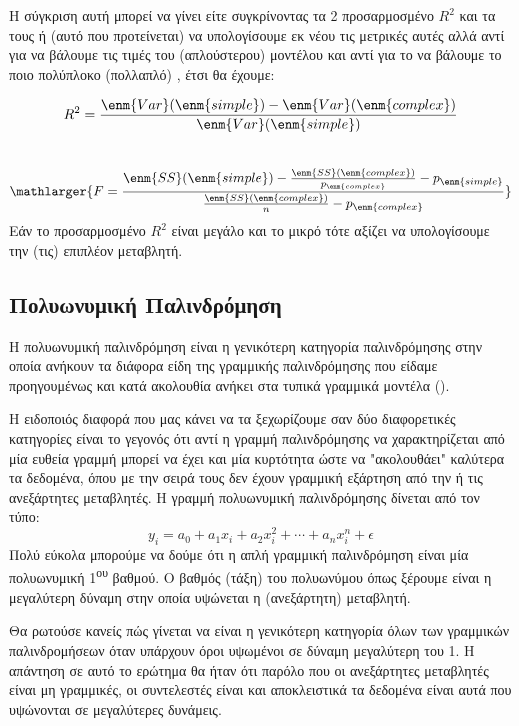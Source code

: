 Η σύγκριση αυτή μπορεί να γίνει είτε
συγκρίνοντας τα 2 προσαρμοσμένο $R^2$
και τα  τους ή (αυτό που προτείνεται) να
υπολογίσουμε εκ νέου τις μετρικές αυτές αλλά αντί για  να βάλουμε τις τιμές του 
(απλούστερου) μοντέλου και αντί για το  να βάλουμε το ποιο πολύπλοκο (πολλαπλό) , έτσι
θα έχουμε:

$$R^2=\frac{\enm{Var}(\enm{simple})-\enm{Var}(\enm{complex})}{\enm{Var}(\enm{simple})}$$
\\
$$\mathlarger{F =\frac{\enm{SS}(\enm{simple}) - \frac{\enm{SS}(\enm{complex})}{p_{\enm{complex}}} - p_{\enm{simple}}} {\frac{\enm{SS}(\enm{complex})}{n} - p_{\enm{complex}}}}$$
Εάν το προσαρμοσμένο $R^2$
είναι μεγάλο και το  μικρό τότε αξίζει να υπολογίσουμε την
(τις) επιπλέον μεταβλητή.
\subsection{Πολυωνυμική Παλινδρόμηση}
Η πολυωνυμική παλινδρόμηση είναι η γενικότερη κατηγορία παλινδρόμησης στην οποία
ανήκουν τα διάφορα είδη της γραμμικής παλινδρόμησης που είδαμε προηγουμένως και κατά
ακολουθία ανήκει στα τυπικά γραμμικά μοντέλα ().

Η ειδοποιός
διαφορά που μας κάνει να τα ξεχωρίζουμε σαν δύο διαφορετικές κατηγορίες είναι το γεγονός
ότι αντί η γραμμή παλινδρόμησης να χαρακτηρίζεται από μία ευθεία γραμμή μπορεί να έχει
και μία κυρτότητα ώστε να "ακολουθάει" καλύτερα τα δεδομένα, όπου με την σειρά τους δεν
έχουν γραμμική εξάρτηση από την ή τις ανεξάρτητες μεταβλητές. Η γραμμή πολυωνυμική
παλινδρόμησης δίνεται από τον τύπο:
$$y_i=a_0+a_1x_i+a_2x_i^2+\cdots +a_nx_i^n+\epsilon$$
Πολύ εύκολα μπορούμε να δούμε ότι η απλή γραμμική παλινδρόμηση είναι μία πολυωνυμική
1\textsuperscript{ου} βαθμού. Ο βαθμός (τάξη) του πολυωνύμου όπως ξέρουμε είναι η μεγαλύτερη δύναμη
στην οποία υψώνεται η (ανεξάρτητη) μεταβλητή.

Θα ρωτούσε κανείς πώς γίνεται να είναι η
γενικότερη κατηγορία όλων των γραμμικών παλινδρομήσεων όταν υπάρχουν όροι υψωμένοι
σε δύναμη μεγαλύτερη του 1. Η απάντηση σε αυτό το ερώτημα θα ήταν ότι παρόλο που οι
ανεξάρτητες μεταβλητές είναι μη γραμμικές, οι συντελεστές είναι και αποκλειστικά
τα δεδομένα είναι αυτά που υψώνονται σε μεγαλύτερες δυνάμεις.

